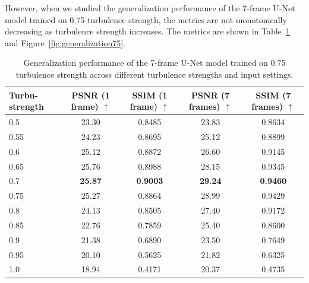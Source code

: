 \documentclass{article}
\begin{document}
However, when we studied the generalization performance of the 7-frame U-Net model trained on 0.75 turbulence strength, the metrics are not monotonically decreasing as turbulence strength increases. The metrics are shown in Table~\ref{tab:generalization75} and Figure~\ref{fig:generalization75}. 


\begin{table}[H]
    \centering
    \caption{Generalization performance of the 7-frame U-Net model trained on 0.75 turbulence strength across different turbulence strengths and input settings.}
    \label{tab:generalization75}
    \begin{tabular}{lcccc}
        \toprule
        Turbu-strength & PSNR (1 frame) $\uparrow$ & SSIM (1 frame) $\uparrow$ & PSNR (7 frames) $\uparrow$ & SSIM (7 frames) $\uparrow$ \\
        \midrule
        0.5 & 23.30 & 0.8485 & 23.83 & 0.8634 \\
        0.55 & 24.23 & 0.8695 & 25.12 & 0.8899 \\
        0.6 & 25.12 & 0.8872 & 26.60 & 0.9145 \\
        0.65 & 25.76 & 0.8988 & 28.15 & 0.9345 \\
        0.7 & \textbf{25.87} & \textbf{0.9003} & \textbf{29.24} & \textbf{0.9460} \\
        0.75 & 25.27 & 0.8864 & 28.99 & 0.9429 \\
        0.8 & 24.13 & 0.8505 & 27.40 & 0.9172 \\
        0.85 & 22.76 & 0.7859 & 25.40 & 0.8600 \\
        0.9 & 21.38 & 0.6890 & 23.50 & 0.7649 \\
        0.95 & 20.10 & 0.5625 & 21.82 & 0.6325 \\
        1.0 & 18.94 & 0.4171 & 20.37 & 0.4735 \\
        \bottomrule
    \end{tabular}
\end{table}
\end{document}
